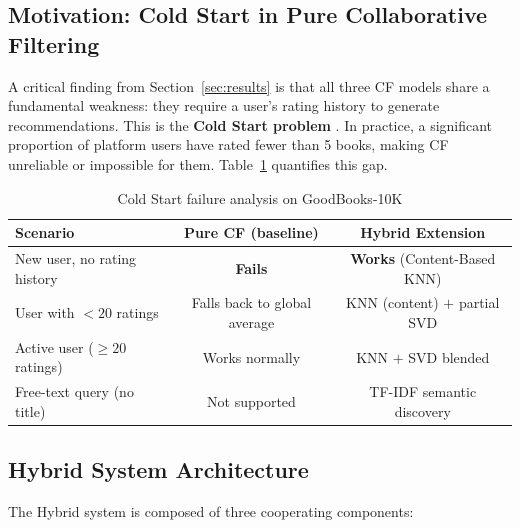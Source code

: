 \documentclass[12pt, a4paper]{article}
\begin{document}
\subsection{Motivation: Cold Start in Pure Collaborative Filtering}

A critical finding from Section~\ref{sec:results} is that all three CF models share a
fundamental weakness: they require a user's rating history to generate recommendations.
This is the \textbf{Cold Start problem} \cite{schein2002}.
In practice, a significant proportion of platform users have rated fewer than 5 books,
making CF unreliable or impossible for them.
Table~\ref{tab:coldstart_gap} quantifies this gap.

\begin{table}[H]
  \centering
  \caption{Cold Start failure analysis on GoodBooks-10K}
  \label{tab:coldstart_gap}
  \begin{tabular}{|l|c|c|}
    \hline
    \textbf{Scenario} & \textbf{Pure CF (baseline)} & \textbf{Hybrid Extension} \\
    \hline
    New user, no rating history & \textbf{Fails} & \textbf{Works} (Content-Based KNN) \\
    \hline
    User with $< 20$ ratings & Falls back to global average & KNN (content) $+$ partial SVD \\
    \hline
    Active user ($\geq 20$ ratings) & Works normally & KNN $+$ SVD blended \\
    \hline
    Free-text query (no title) & Not supported & TF-IDF semantic discovery \\
    \hline
  \end{tabular}
\end{table}

\subsection{Hybrid System Architecture}


The Hybrid system is composed of three cooperating components:
\end{document}
